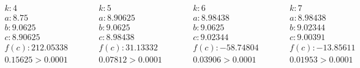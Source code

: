 \documentclass[letterpaper, 11pt]{extarticle}
\begin{document}
\begin{align*}
    \begin{aligned}
        & k: 4 \\
        & a: 8.75 \\
        & b: 9.0625 \\
        & c: 8.90625 \\
        & f(c): 212.05338 \\
        & 0.15625 > 0.0001
    \end{aligned}
    \qquad
    \begin{aligned}
        & k: 5 \\
        & a: 8.90625 \\
        & b: 9.0625 \\
        & c: 8.98438 \\
        & f(c): 31.13332 \\
        & 0.07812 > 0.0001
    \end{aligned}
    \qquad
    \begin{aligned}
        & k: 6 \\
        & a: 8.98438 \\
        & b: 9.0625 \\
        & c: 9.02344 \\
        & f(c): -58.74804 \\
        & 0.03906 > 0.0001
    \end{aligned}
    \qquad
    \begin{aligned}
        & k: 7 \\
        & a: 8.98438 \\
        & b: 9.02344 \\
        & c: 9.00391 \\
        & f(c): -13.85611 \\
        & 0.01953 > 0.0001
    \end{aligned}
\end{align*}

\vspace{-5pt}
\end{document}
